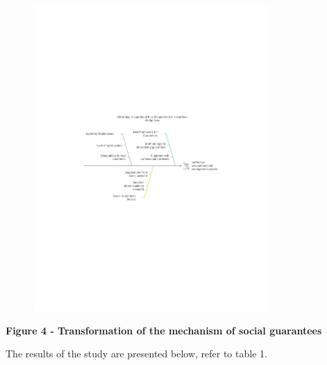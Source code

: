\begin{figure}[H]
	\centering
	\includegraphics[width=0.8\textwidth]{media/gorn/image5}
	\caption*{}
\end{figure}


{\bfseries Figure 4 - Transformation of the mechanism of social guarantees}

The results of the study are presented below, refer to table 1.

